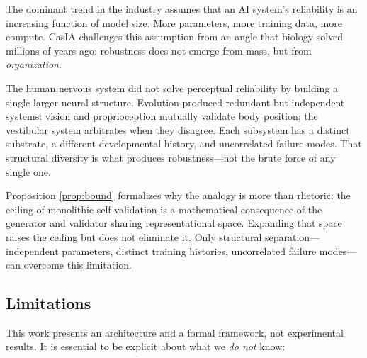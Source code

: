 \documentclass[11pt,a4paper]{article}
\theoremstyle{remark}
\begin{document}
The dominant trend in the industry assumes that an AI system's reliability is an increasing function of model size. More parameters, more training data, more compute. CasIA challenges this assumption from an angle that biology solved millions of years ago: robustness does not emerge from mass, but from \emph{organization}.

The human nervous system did not solve perceptual reliability by building a single larger neural structure. Evolution produced redundant but independent systems: vision and proprioception mutually validate body position; the vestibular system arbitrates when they disagree. Each subsystem has a distinct substrate, a different developmental history, and uncorrelated failure modes. That structural diversity is what produces robustness---not the brute force of any single one.

Proposition \ref{prop:bound} formalizes why the analogy is more than rhetoric: the ceiling of monolithic self-validation is a mathematical consequence of the generator and validator sharing representational space. Expanding that space raises the ceiling but does not eliminate it. Only structural separation---independent parameters, distinct training histories, uncorrelated failure modes---can overcome this limitation.

\subsection{Limitations}

This work presents an architecture and a formal framework, not experimental results. It is essential to be explicit about what we \emph{do not} know:
\end{document}
